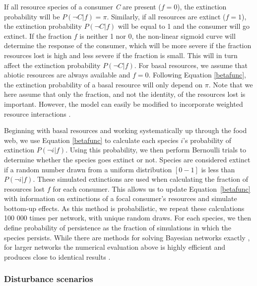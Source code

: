 \documentclass[12pt]{article}
\begin{document}
\begin{spacing}{2.0}
		If all resource species of a consumer \textit{C} are present ($f = 0$), the extinction probability will be $P(\lnot C|f) = \pi$. 
		Similarly, if all resources are extinct ($f = 1$), the extinction probability $P(\lnot C|f)$ will be equal to 1 and the consumer will go extinct.
		If the fraction $f$ is neither 1 nor 0, the non-linear sigmoid curve will determine the response of the consumer, which will be more severe if the fraction resources lost is high and less severe if the fraction is small. This will in turn affect the extinction probability $P(\lnot C|f)$.
		For basal resources, we assume that abiotic resources are always available and $f=0$. 
		Following Equation \ref{betafunc}, the extinction probability of a basal resource will only depend on $\pi$.
		Note that we here assume that only the fraction, and not the identity, of the resources lost is important. 
		However, the model can easily be modified to incorporate weighted resource interactions \citep[see][]{Eklof2013}.
		
		
        Beginning with basal resources and working systematically up through the food web, we use Equation \ref{betafunc} to calculate each species $i$'s probability of extinction $P(\lnot i|f)$.
        Using this probability, we then perform Bernoulli trials to determine whether the species goes extinct or not. 
        Species are considered extinct if a random number drawn from a uniform distribution $[0-1]$ is less than $P(\lnot i|f)$.
        These simulated extinctions are used when calculating the fraction of resources lost $f$ for each consumer.
        This allows us to update Equation~\ref{betafunc} with information on extinctions of a focal consumer's resources and simulate bottom-up effects. As this method is probabilistic, we repeat these calculations 100 000 times per network, with unique random draws.
        For each species, we then define probability of persistence as the fraction of simulations in which the species persists. 
        While there are methods for solving Bayesian networks exactly \citep{Eklof2013}, for larger networks the numerical evaluation above is highly efficient and produces close to identical results \citep{Haussler2020}.
		
	
		
        \subsubsection*{Disturbance scenarios}
        

\end{spacing}
\end{document}
